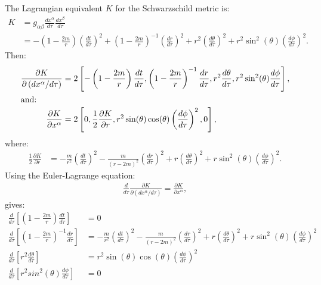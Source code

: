 \documentclass[a4paper]{article}
\begin{document}
\subsection{}
The Lagrangian equivalent $K$ for the Schwarzschild metric is:
\begin{align*}
	K &= g_{\alpha \beta} \frac{dx^\alpha}{d\tau} \frac{dx^\beta}{d\tau}\\
	&=	-\left( 1- \frac{2m}{r}\right) \left( \frac{dt}{d\tau} \right)^2 + \left( 1- \frac{2m}{r}\right)^{-1} \left( \frac{dr}{d\tau} \right)^2    + r^2 \left( \frac{d\theta}{d\tau} \right)^2  + r^2 \sin^2(\theta) \left( \frac{d\phi}{d\tau} \right)^2  . 
\end{align*}
Then:
\begin{align*}
\frac{\partial K}{\partial \left(dx^\alpha / d\tau \right)} &= 2\left[-\left( 1- \frac{2m}{r}\right) \frac{dt}{d\tau} , \left( 1- \frac{2m}{r}\right)^{-1} \frac{dr}{d\tau} , r^2 \frac{d\theta}{d\tau} , r^2 \sin^2(\theta) \frac{d\phi}{d\tau} \right], \\
\intertext{and:}
\frac{\partial K}{\partial x^\alpha} &= 2\left[0, \frac{1}{2}\frac{\partial K}{\partial r}, r^2 \sin(\theta)\cos(\theta) \left( \frac{d\phi}{d\tau} \right)^2, 0 \right],
\end{align*}
where:
\begin{align*}
	\frac{1}{2}\frac{\partial K}{\partial r} &= -\frac{m}{r^2} \left(\frac{dt}{d\tau} \right)^2 - \frac{m}{(r-2m)^2}  \left(\frac{dr}{d\tau} \right)^2 + r  \left(\frac{d\theta}{d\tau} \right)^2  + r\sin^2(\theta)  \left(\frac{d\phi}{d\tau} \right)^2.
\end{align*}
Using the Euler-Lagrange equation:
\begin{align*}
\frac{d}{d\tau} \frac{\partial K}{\partial(dx^\alpha / d\tau)}  = \frac{\partial K}{\partial x^\alpha},
\end{align*}
gives:
\begin{align*}
	\frac{d}{d\tau} \left[ \left(1-\frac{2m}{r}\right) \frac{dt}{d\tau} \right] &= 0\\
	\frac{d}{d\tau} \left[ \left( 1- \frac{2m}{r}\right)^{-1} \frac{dr}{d\tau} \right] &=  -\frac{m}{r^2} \left(\frac{dt}{d\tau} \right)^2 - \frac{m}{(r-2m)^2}  \left(\frac{dr}{d\tau} \right)^2 + r  \left(\frac{d\theta}{d\tau} \right)^2  + r\sin^2(\theta)  \left(\frac{d\phi}{d\tau} \right)^2\\
	\frac{d}{d\tau} \left[ r^2 \frac{d\theta}{d\tau}  \right]  &= r^2 \sin(\theta)\cos(\theta) \left( \frac{d\phi}{d\tau} \right)^2 \\
	\frac{d}{d\tau} \left[r^2 sin^2(\theta) \frac{d\phi}{d\tau} \right] &= 0
\end{align*}
\end{document}
